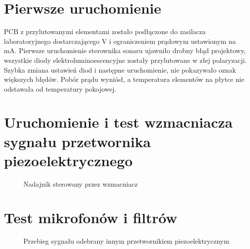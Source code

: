 \section{Pierwsze uruchomienie}
PCB z przylutowanymi elementami zostało podłączone do zasilacza laboratoryjnego dostarczającego \unit[5]{V} i ograniczeniem prądowym ustawionym na \unit[100]{mA}. 
Pierwsze uruchomienie sterownika sonaru ujawniło drobny błąd projektowy, wszystkie diody elektroluminoescencyjne zostały przylutowane w złej polaryzacji.
Szybka zmiana ustawień diod i następne uruchomienie, nie pokazywało oznak większych błędów. Pobór prądu wyniósł, a temperatura elementów na 
płytce nie odstawała od temperatury pokojowej.

\section{Uruchomienie i test wzmacniacza sygnału przetwornika piezoelektrycznego}

\begin{figure}[!ht]
    \centering
    \caption{Nadajnik sterowany przez wzmacniacz}
    \label{fig:oscylo_piezo3}
\end{figure}

\section{Test mikrofonów i filtrów}


\begin{figure}[!ht]
    \centering
    \caption{Przebieg sygnału odebrany innym przetwornikiem piezoelektrycznym}
    \label{fig:oscylo_piezo4}
\end{figure}

